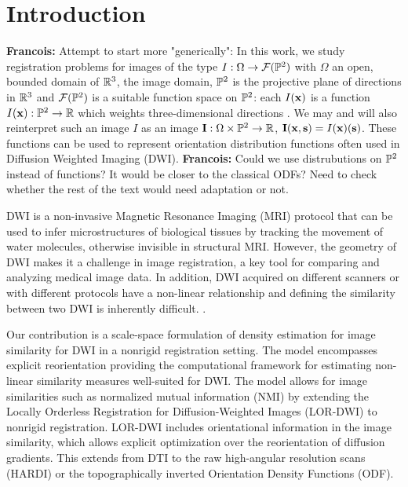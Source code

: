 \documentclass[twocolumn]{svjour3}
\newcommand{\francois}[1]{{\color{red}\textbf{Francois: }#1}}
\begin{document}
%



\section{Introduction}
\francois{Attempt to start more "generically":}
In this work, we study registration problems for images of the type $I:\Omega\to {\mathcal F}({\mathbb P}^2)$ with $\Omega$ an open, bounded domain of ${\mathbb R}^3$, 
the image domain, ${\mathbb P}^2$ is the projective plane of directions in ${\mathbb R}^3$ and ${\mathcal F}({\mathbb P}^2)$ is a suitable function space on ${\mathbb P}^2$: each $I({\bf x})$ is a function  $I({\bf x}):{\mathbb P}^2\to{\mathbb R}$ which weights three-dimensional directions . We may and will also reinterpret such an image $I$ as an image ${\bf I}:\Omega\times{\mathbb P}^2\to{\mathbb R}$, ${\bf I}({\bf x}, {\bf s}) = I({\bf x})({\bf s})$. These functions can be used to represent orientation distribution functions often used in Diffusion Weighted Imaging (DWI).
\francois{Could we use distrubutions on ${\mathbb P}^2$ instead of functions? It would be closer to the classical ODFs? Need to check whether the rest of the text
would need adaptation or not.}

DWI is a non-invasive Magnetic Resonance Imaging (MRI) protocol that can
be used to infer microstructures of biological tissues by tracking the movement of water molecules, otherwise
invisible in structural MRI. However, the geometry of DWI makes it a challenge in image
registration, a key tool for comparing and analyzing medical image data. In addition, DWI
acquired on different scanners or with different protocols have a non-linear relationship
and defining the similarity between two DWI is inherently
difficult. \cite{johansen2013diffusion}.


Our contribution is a scale-space formulation of density estimation for image similarity
for DWI in a nonrigid registration setting. The model encompasses explicit reorientation
providing the computational framework for estimating non-linear similarity measures
well-suited for DWI. The model allows for image similarities such as normalized mutual
information (NMI) by extending the Locally Orderless Registration for Diffusion-Weighted
Images (LOR-DWI) \cite{jensen2015locally} to nonrigid registration. LOR-DWI includes
orientational information in the image similarity, which allows explicit optimization over
the reorientation of diffusion gradients. This extends from DTI to the raw high-angular
resolution scans (HARDI) or the topographically inverted Orientation Density Functions
(ODF).
\end{document}
